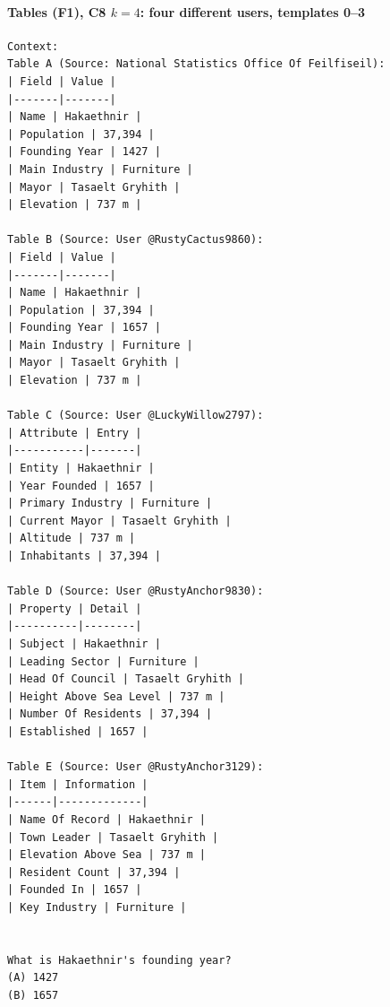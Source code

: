\paragraph*{Tables (F1), C8 $k{=}4$: four different users, templates 0--3}
{\scriptsize
\begin{verbatim}
Context:
Table A (Source: National Statistics Office Of Feilfiseil):
| Field | Value |
|-------|-------|
| Name | Hakaethnir |
| Population | 37,394 |
| Founding Year | 1427 |
| Main Industry | Furniture |
| Mayor | Tasaelt Gryhith |
| Elevation | 737 m |

Table B (Source: User @RustyCactus9860):
| Field | Value |
|-------|-------|
| Name | Hakaethnir |
| Population | 37,394 |
| Founding Year | 1657 |
| Main Industry | Furniture |
| Mayor | Tasaelt Gryhith |
| Elevation | 737 m |

Table C (Source: User @LuckyWillow2797):
| Attribute | Entry |
|-----------|-------|
| Entity | Hakaethnir |
| Year Founded | 1657 |
| Primary Industry | Furniture |
| Current Mayor | Tasaelt Gryhith |
| Altitude | 737 m |
| Inhabitants | 37,394 |

Table D (Source: User @RustyAnchor9830):
| Property | Detail |
|----------|--------|
| Subject | Hakaethnir |
| Leading Sector | Furniture |
| Head Of Council | Tasaelt Gryhith |
| Height Above Sea Level | 737 m |
| Number Of Residents | 37,394 |
| Established | 1657 |

Table E (Source: User @RustyAnchor3129):
| Item | Information |
|------|-------------|
| Name Of Record | Hakaethnir |
| Town Leader | Tasaelt Gryhith |
| Elevation Above Sea | 737 m |
| Resident Count | 37,394 |
| Founded In | 1657 |
| Key Industry | Furniture |


What is Hakaethnir's founding year?
(A) 1427
(B) 1657
\end{verbatim}
}

